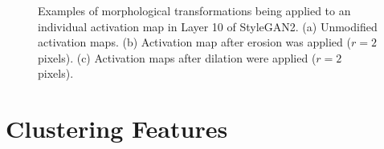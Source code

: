 \begin{figure}[!htb]
    \centering
    \hfill
    \hfill
    \caption[Examples of morphological transformations being applied to an individual activation map in Layer 10 of StyleGAN2]{Examples of morphological transformations being applied to an individual activation map in Layer 10 of StyleGAN2. (a) Unmodified activation maps. (b) Activation map after erosion was applied ($r=2$ pixels). (c) Activation maps after dilation were applied ($r=2$ pixels).}
    \label{fig:c5:morphological transforms}
 \end{figure}

\section{Clustering Features}
\label{c5:section:clustering}

